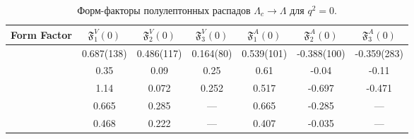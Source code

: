 \begin{table}[H]
    \centering
    \caption{Форм-факторы полулептонных распадов $\Lambda_c \to \Lambda$ для $q^2 = 0$.}
    \begin{tabular}{|c|c|c|c|c|c|c|}
    \hline
    Form Factor & $\mathfrak{F}_1^V(0)$ & $\mathfrak{F}_2^V(0)$ & $\mathfrak{F}_3^V(0)$ & $\mathfrak{F}_1^A(0)$ & $\mathfrak{F}_2^A(0)$ & $\mathfrak{F}_3^A(0)$ \\
    \hline
    \textbf{\cite{QCD2021}} & 0.687(138) & 0.486(117) & 0.164(80) & 0.539(101) & -0.388(100) & -0.359(283) \\
    \hline
    \textbf{\cite{BagModel1989}} & 0.35 & 0.09 & 0.25 & 0.61 & -0.04 & -0.11 \\
    \hline
    \textbf{\cite{RQM2016}} & 1.14 & 0.072 & 0.252 & 0.517 & -0.697 & -0.471 \\
    \hline
    \textbf{\cite{QSR2009}} & 0.665 & 0.285 & --- & 0.665 & -0.285 & --- \\
    \hline
    \textbf{\cite{LFCQM2018}} & 0.468 & 0.222 & --- & 0.407 & -0.035 & --- \\
    \hline
    \end{tabular}
    \label{tb:chd}
\end{table}
